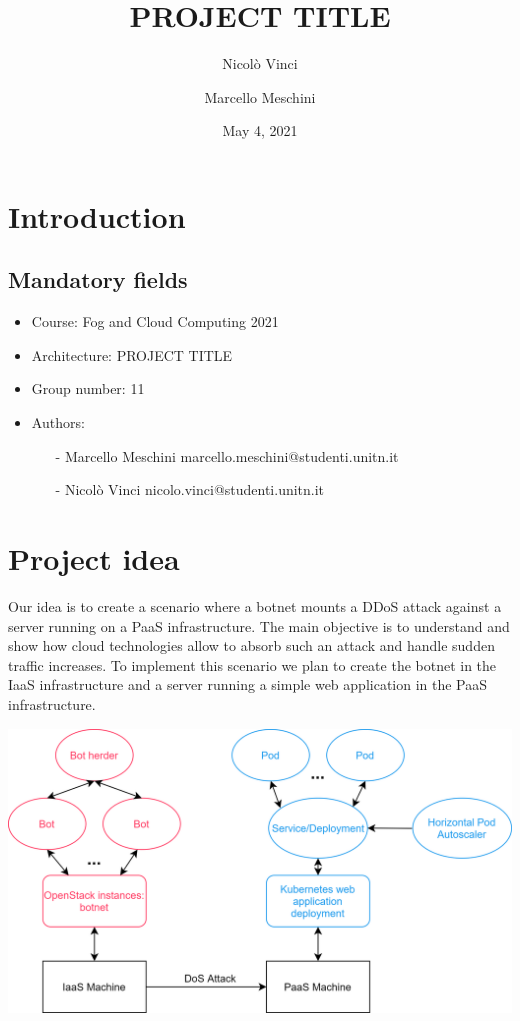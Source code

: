 \documentclass{article}
\title{PROJECT TITLE}
\author{Nicolò Vinci  \\
	\and 
	Marcello Meschini \\
	}
\date{May 4, 2021}
\begin{document}
\maketitle

\section{Introduction}
\label{intro}

\subsection{Mandatory fields}
\label{mfields}

\begin{itemize}
\item Course: Fog and Cloud Computing 2021
\item Architecture: PROJECT TITLE
\item Group number: 11
\item Authors:

\begin{itemize}
\item[-] Marcello Meschini marcello.meschini@studenti.unitn.it
\item[-] Nicolò Vinci nicolo.vinci@studenti.unitn.it
\end{itemize}

\end{itemize}

\section{Project idea} 
\label{idea}
Our idea is to create a scenario where a botnet mounts a DDoS attack against a server running on a PaaS infrastructure. The main objective is to understand and show how cloud technologies allow to absorb such an attack and handle sudden traffic increases. 
To implement this scenario we plan to create the botnet in the IaaS infrastructure and a server running a simple web application in the PaaS infrastructure.

\begin{center}
	\includegraphics[scale=0.8]{schema.png}
    	\label{fig:schema}
\end{center}
\end{document}

